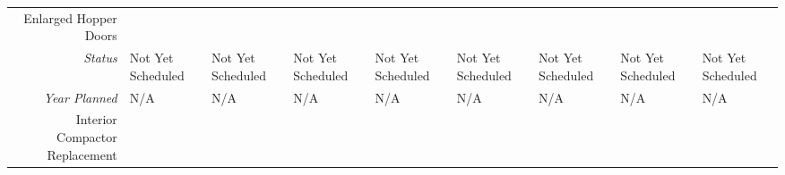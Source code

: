 \begin{tabularx}{\textwidth}{r|X|X|X|X|X|X|X|X|}
\multicolumn{1}{|V{.2\columnwidth}|}{\cellcolor{ccorangelight}Enlarged Hopper Doors}          &                                                                  &                                                                  &                                                                  &                                                                  &                                                                  &                                                                  &                                                                  &                                                                  \\
    \multicolumn{1}{|r|}{\cellcolor{ccorangelight}\textit{Status}}                & Not Yet Scheduled                                                         & Not Yet Scheduled                                                         & Not Yet Scheduled                                                         & Not Yet Scheduled                                                         & Not Yet Scheduled                                                         & Not Yet Scheduled                                                         & Not Yet Scheduled                                                         & Not Yet Scheduled                                                         \\
    \multicolumn{1}{|r|}{\cellcolor{ccorangelight}\textit{Year Planned}}                  & N/A                                                     & N/A                                                     & N/A                                                     & N/A                                                     & N/A                                                     & N/A                                                     & N/A                                                     & N/A                                                     \\ \hline
\multicolumn{1}{|V{.2\columnwidth}|}{\cellcolor{ccorangelight}Interior Compactor Replacement}          &                                                                  &                                                                  &                                                                  &                                                                  &                                                                  &                                                                  &                                                                  &                                                                  \\

\end{tabularx}
